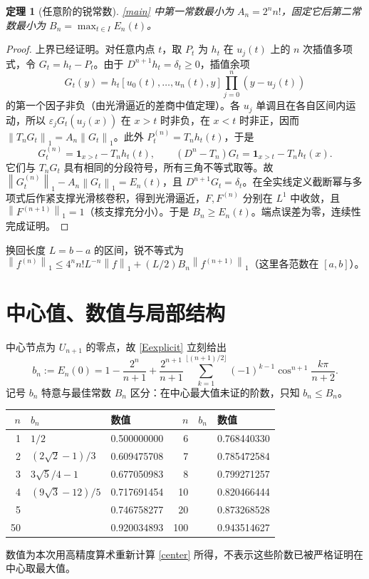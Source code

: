 \documentclass[11pt,a4paper,fontset=fandol]{ctexart}
\newcommand{\norm}[1]{\left\|#1\right\|_1}
\newtheorem{theorem}{定理}
\theoremstyle{remark}\newtheorem{conjecture}{猜想}
\begin{document}
\begin{theorem}[任意阶的锐常数]\label{thm:sharp}
\eqref{main} 中第一常数最小为 $A_n=2^nn!$，固定它后第二常数最小为 $B_n=\max_{t\in I}E_n(t)$。
\end{theorem}
\begin{proof}
上界已经证明。对任意内点 $t$，取 $P_t$ 为 $h_t$ 在 $u_j(t)$ 上的 $n$ 次插值多项式，令 $G_t=h_t-P_t$。由于 $D^{n+1}h_t=\delta_t\ge0$，插值余项
\[
 G_t(y)=h_t[u_0(t),\ldots,u_n(t),y]\prod_{j=0}^n(y-u_j(t))
\]
的第一个因子非负（由光滑逼近的差商中值定理）。各 $u_j$ 单调且在各自区间内运动，所以 $\varepsilon_jG_t(u_j(x))$ 在 $x>t$ 时非负，在 $x<t$ 时非正，因而 $\norm{T_nG_t}=A_n\norm{G_t}$。此外 $P_t^{(n)}=T_nh_t(t)$，于是
\[
 G_t^{(n)}=\mathbf1_{x>t}-T_nh_t(t),\qquad (D^n-T_n)G_t=\mathbf1_{x>t}-T_nh_t(x).
\]
它们与 $T_nG_t$ 具有相同的分段符号，所有三角不等式取等。故 $\norm{G_t^{(n)}}-A_n\norm{G_t}=E_n(t)$，且 $D^{n+1}G_t=\delta_t$。在全实线定义截断幂与多项式后作紧支撑光滑核卷积，得到光滑逼近，$F,F^{(n)}$ 分别在 $L^1$ 中收敛，且 $\norm{F^{(n+1)}}=1$（核支撑充分小）。于是 $B_n\ge E_n(t)$。端点误差为零，连续性完成证明。
\end{proof}
换回长度 $L=b-a$ 的区间，锐不等式为 $\norm{f^{(n)}}\le 4^nn!L^{-n}\norm f+(L/2)B_n\norm{f^{(n+1)}}$（这里各范数在 $[a,b]$）。

\section{中心值、数值与局部结构}\label{sec:center}
中心节点为 $U_{n+1}$ 的零点，故 \eqref{Eexplicit} 立刻给出
\begin{equation}\label{center}
 b_n:=E_n(0)=1-\frac{2^n}{n+1}+\frac{2^{n+1}}{n+1}
 \sum_{k=1}^{\lfloor(n+1)/2\rfloor}(-1)^{k-1}\cos^{n+1}\frac{k\pi}{n+2}.
\end{equation}
记号 $b_n$ 特意与最佳常数 $B_n$ 区分：在中心最大值未证的阶数，只知 $b_n\le B_n$。
\begin{center}
\begin{tabular}{rll@{\qquad}rll}\toprule
$n$ & $b_n$ & 数值 & $n$ & $b_n$ & 数值\\\midrule
1 & $1/2$ & 0.500000000 & 6 & & 0.768440330\\
2 & $(2\sqrt2-1)/3$ & 0.609475708 & 7 & & 0.785472584\\
3 & $3\sqrt5/4-1$ & 0.677050983 & 8 & & 0.799271257\\
4 & $(9\sqrt3-12)/5$ & 0.717691454 & 10 & & 0.820466444\\
5 & & 0.746758277 & 20 & & 0.873268528\\
50 & & 0.920034893 & 100 & & 0.943514627\\\bottomrule
\end{tabular}
\end{center}
数值为本次用高精度算术重新计算 \eqref{center} 所得，不表示这些阶数已被严格证明在中心取最大值。
\end{document}
